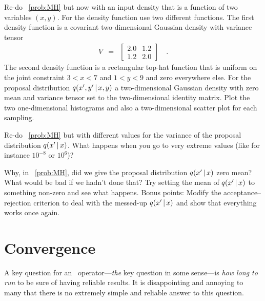 \documentclass[12pt,twoside,pdftex]{article}
\newcommand{\MCMC}{\acronym{MCMC}}
\begin{document}
\begin{problem}\label{prob:twod}
Re-do \problemname~\ref{prob:MH} but now with an input density
that is a function of two variables $(x, y)$.
For the density function use two different functions.
The first density function is a covariant two-dimensional Gaussian density with variance tensor
\begin{eqnarray}
V &=& \left[\begin{array}{cc} 2.0 & 1.2 \\ 1.2 & 2.0 \end{array}\right]
\quad .
\end{eqnarray}
The second density function is a rectangular top-hat function that is uniform on
the joint constraint $3<x<7$ and $1<y<9$ and zero everywhere else.
For the proposal distribution $q(x', y'\,|\, x, y)$ a two-dimensional Gaussian
density with zero mean and variance tensor set to the two-dimensional
identity matrix.
Plot the two one-dimensional histograms and also a two-dimensional scatter
plot for each sampling.
\end{problem}

\begin{problem}
Re-do \problemname~\ref{prob:MH} but with different values for
the variance of the proposal distribution $q(x'\,|\, x)$.
What happens when you go to very extreme values (like for instance
$10^{-8}$ or $10^6$)?
\end{problem}

\begin{problem}
Why, in \problemname~\ref{prob:MH}, did we give the proposal
distribution $q(x'\,|\, x)$ zero mean?
What would be bad if we hadn't done that?
Try setting the mean of $q(x'\,|\, x)$ to something non-zero and see
what happens.
Bonus points: Modify the acceptance--rejection criterion to deal with
the messed-up $q(x'\,|\, x)$ and show that everything works once
again.
\end{problem}

\section{Convergence}\label{sec:convergence}

A key question for an \MCMC\ operator---\emph{the} key question in some
sense---is \emph{how long to run} to be sure of having reliable
results.
It is disappointing and annoying to many that there is no extremely
simple and reliable answer to this question.
\end{document}
